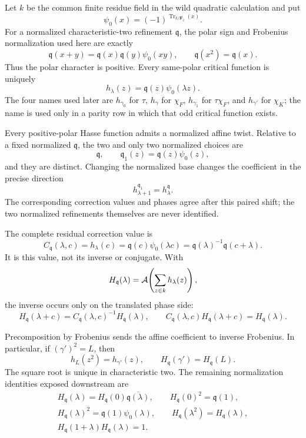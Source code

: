 \begin{theorem}\label{mod:cases-wildquadratic-quadraticrefinement}
Let $k$ be the common finite residue field in the wild quadratic
calculation and put
\[
 \psi_0(x)=(-1)^{\operatorname{Tr}_{k/\mathbf F_2}(x)}.
\]
For a normalized characteristic-two refinement $\mathfrak q$, the
polar sign and Frobenius normalization used here are exactly
\[
 \mathfrak q(x+y)=\mathfrak q(x)\mathfrak q(y)\psi_0(xy),
 \qquad \mathfrak q(x^2)=\mathfrak q(x).
\]
Thus the polar character is positive.  Every same-polar critical
function is uniquely
\[
 h_\lambda(z)=\mathfrak q(z)\psi_0(\lambda z).
\]
The four names used later are
$h_{\gamma_0}$ for $\tau$, $h_\gamma$ for $\chi_F$,
$h_{\gamma_1}$ for $\tau\chi_F$, and $h_{\gamma'}$ for $\chi_K$;
the name is used only in a parity row in which that odd critical
function exists.

Every positive-polar Hasse function admits a normalized affine twist.
Relative to a fixed normalized $\mathfrak q$, the two and only two
normalized choices are
\[
 \mathfrak q,\qquad
 \mathfrak q_1(z)=\mathfrak q(z)\psi_0(z),
\]
and they are distinct.  Changing the normalized base changes the
coefficient in the precise direction
\[
 h^{\mathfrak q_1}_{\lambda+1}=h^{\mathfrak q}_\lambda.
\]
The corresponding correction values and phases agree after this
paired shift; the two normalized refinements themselves are never
identified.

The complete residual correction value is
\[
 C_{\mathfrak q}(\lambda,c)
 =h_\lambda(c)
 =\mathfrak q(c)\psi_0(\lambda c)
 =\mathfrak q(\lambda)^{-1}\mathfrak q(c+\lambda).
\]
It is this value, not its inverse or conjugate.  With
\[
 H_{\mathfrak q}(\lambda)
 =\mathcal A\!\left(\sum_{z\in k}h_\lambda(z)\right),
\]
the inverse occurs only on the translated phase side:
\[
 H_{\mathfrak q}(\lambda+c)
 =C_{\mathfrak q}(\lambda,c)^{-1}H_{\mathfrak q}(\lambda),
 \qquad
 C_{\mathfrak q}(\lambda,c)H_{\mathfrak q}(\lambda+c)
 =H_{\mathfrak q}(\lambda).
\]

Precomposition by Frobenius sends the affine coefficient to inverse
Frobenius.  In particular, if $(\gamma')^2=L$, then
\[
 h_L(z^2)=h_{\gamma'}(z),
 \qquad H_{\mathfrak q}(\gamma')=H_{\mathfrak q}(L).
\]
The square root is unique in characteristic two.  The remaining
normalization identities exposed downstream are
\[
 \begin{gathered}
 H_{\mathfrak q}(\lambda)
   =H_{\mathfrak q}(0)\overline{\mathfrak q(\lambda)},
 \qquad H_{\mathfrak q}(0)^2=\mathfrak q(1),\\
 H_{\mathfrak q}(\lambda)^2
   =\mathfrak q(1)\psi_0(\lambda),
 \qquad H_{\mathfrak q}(\lambda^2)=H_{\mathfrak q}(\lambda),\\
 H_{\mathfrak q}(1+\lambda)H_{\mathfrak q}(\lambda)=1.
 \end{gathered}
\]


\end{theorem}
